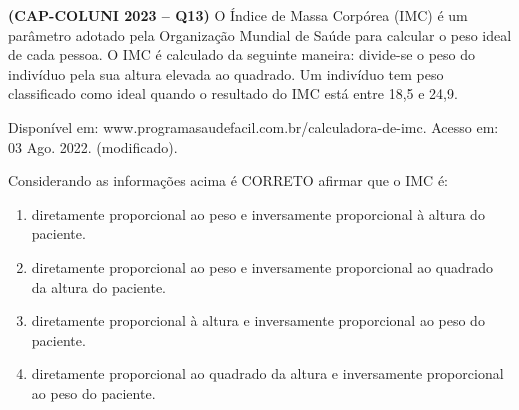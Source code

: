 \textbf{(CAP-COLUNI 2023 -- Q13)} O Índice de Massa Corpórea (IMC) é um parâmetro adotado pela Organização Mundial de Saúde para calcular o peso ideal de cada pessoa. O IMC é calculado da seguinte maneira: divide-se o peso do indivíduo pela sua altura elevada ao quadrado. Um indivíduo tem peso classificado como ideal quando o resultado do IMC está entre 18,5 e 24,9.

Disponível em: www.programasaudefacil.com.br/calculadora-de-imc. Acesso em: 03 Ago. 2022. (modificado).

Considerando as informações acima é CORRETO afirmar que o IMC é:

\begin{enumerate}
	\item diretamente proporcional ao peso e inversamente proporcional à altura do paciente.
	\item diretamente proporcional ao peso e inversamente proporcional ao quadrado da altura do paciente.
	\item diretamente proporcional à altura e inversamente proporcional ao peso do paciente.
	\item diretamente proporcional ao quadrado da altura e inversamente proporcional ao peso do paciente.
\end{enumerate}
